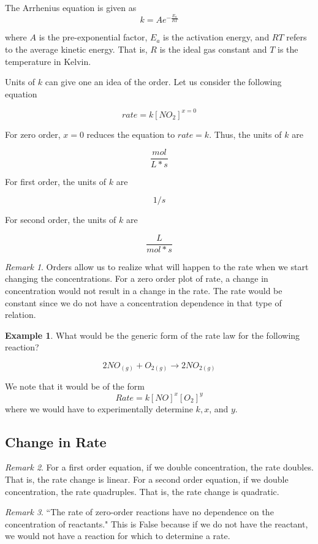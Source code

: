 \documentclass[11pt]{article}
\theoremstyle{plain} %
\theoremstyle{definition}
\theoremstyle{example}
\newtheorem*{example}{Example}
\theoremstyle{remark}
\newtheorem*{remark}{Remark}
\begin{document}
The Arrhenius equation is given as
$$k = Ae^{-\frac{E_a}{RT}}$$

where $A$ is the pre-exponential factor, $E_a$ is the activation energy, and $RT$ refers to the average kinetic energy. That is, $R$ is the ideal gas constant and $T$ is the temperature in Kelvin. 

Units of $k$ can give one an idea of the order. Let us consider the following equation

$$rate = k[NO_2]^{x=0}$$

For zero order, $x=0$ reduces the equation to $rate = k$. Thus, the units of $k$ are

$$\frac{mol}{L*s}$$


For first order, the units of $k$ are

$$1/s$$

For second order, the units of $k$ are 

$$\frac{L}{mol*s}$$


\begin{remark}Orders allow us to realize what will happen to the rate when we start changing the concentrations. For a zero order plot of rate, a change in concentration would not result in a change in the rate. The rate would be constant since we do not have a concentration dependence in that type of relation. 
\end{remark}


\begin{example}
What would be the generic form of the rate law for the following reaction?

$$2NO_{(g)} + O_{2(g)} \rightarrow 2NO_{2(g)}$$
\end{example}

We note that it would be of the form $$Rate = k[NO]^x[O_2]^y$$ where we would have to experimentally determine $k, x$, and $y$. 

\subsection{Change in Rate}

\begin{remark}
For a first order equation, if we double concentration, the rate doubles. That is, the rate change is linear. For a second order equation, if we double concentration, the rate quadruples. That is, the rate change is quadratic. 
\end{remark}

\begin{remark}``The rate of zero-order reactions have no dependence on the concentration of reactants." This is False because if we do not have the reactant, we would not have a reaction for which to determine a rate. 
\end{remark}
\end{document}
